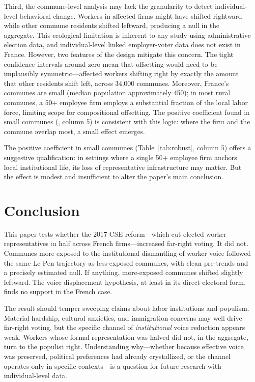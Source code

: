 \documentclass[12pt]{article}
\begin{document}
Third, the commune-level analysis may lack the granularity to detect individual-level behavioral change. Workers in affected firms might have shifted rightward while other commune residents shifted leftward, producing a null in the aggregate. This ecological limitation is inherent to any study using administrative election data, and individual-level linked employer-voter data does not exist in France. However, two features of the design mitigate this concern. The tight confidence intervals around zero mean that offsetting would need to be implausibly symmetric---affected workers shifting right by exactly the amount that other residents shift left, across 34,000 communes. Moreover, France's communes are small (median population approximately 450); in most rural communes, a 50+ employee firm employs a substantial fraction of the local labor force, limiting scope for compositional offsetting. The positive coefficient found in small communes (, column 5) is consistent with this logic: where the firm and the commune overlap most, a small effect emerges.

The positive coefficient in small communes (Table~\ref{tab:robust}, column 5) offers a suggestive qualification: in settings where a single 50+ employee firm anchors local institutional life, its loss of representative infrastructure may matter. But the effect is modest and insufficient to alter the paper's main conclusion.


\section{Conclusion}

This paper tests whether the 2017 CSE reform---which cut elected worker representatives in half across French firms---increased far-right voting. It did not. Communes more exposed to the institutional dismantling of worker voice followed the same Le Pen trajectory as less-exposed communes, with clean pre-trends and a precisely estimated null. If anything, more-exposed communes shifted slightly leftward. The voice displacement hypothesis, at least in its direct electoral form, finds no support in the French case.

The result should temper sweeping claims about labor institutions and populism. Material hardship, cultural anxieties, and immigration concerns may well drive far-right voting, but the specific channel of \textit{institutional} voice reduction appears weak. Workers whose formal representation was halved did not, in the aggregate, turn to the populist right. Understanding why---whether because effective voice was preserved, political preferences had already crystallized, or the channel operates only in specific contexts---is a question for future research with individual-level data.
\end{document}

